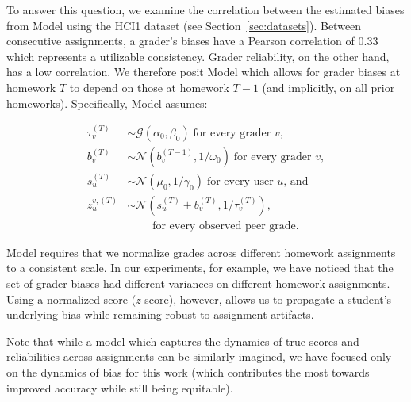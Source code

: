 To answer this question, we examine the correlation between the estimated biases from Model \PGone using 
the HCI1 dataset (see Section~\ref{sec:datasets}). Between consecutive assignments, 
a grader's biases have a Pearson correlation of 0.33 which
represents a utilizable consistency. Grader reliability, on the other hand, has a low correlation.
We therefore posit Model \PGtwo which allows for grader biases
at homework $T$ to depend on those at homework $T-1$ (and implicitly, on all prior homeworks).   Specifically, Model \PGtwo assumes:


{\footnotesize\allowdisplaybreaks
\begin{align*}
\tau_v^{(T)} &\sim  \mathcal{G}(\alpha_0,\beta_0) \;\mbox{for every grader $v$},\\
b_v^{(T)} &\sim \mathcal{N}(b_v^{(T-1)},1/\omega_0) \;\mbox{for every grader $v$},\\
s_u^{(T)}&\sim \mathcal{N}(\mu_0,1/\gamma_0) \; \mbox{for every user $u$, and}\\
z^{v,(T)}_u &\sim \mathcal{N}( s_u^{(T)} + b_v^{(T)}, 1/\tau_v^{(T)} ), \\
       &\qquad \;\mbox{for every observed peer grade.} 
\end{align*}
}

Model \PGtwo requires that we normalize grades across different homework assignments to a consistent scale. In our
experiments, for example, we have noticed that the set of grader
biases had different variances on different homework assignments. Using
a normalized score ($z$-score), however, allows us to propagate a student's underlying bias while remaining robust to assignment
artifacts.

Note that while a model which captures the dynamics of true scores and reliabilities across assignments can be similarly imagined,
we have focused only on the dynamics of bias for this work (which %
contributes the most towards improved accuracy while still being equitable). 

